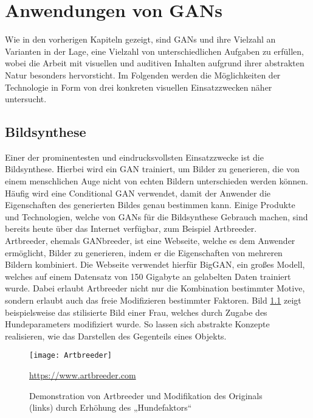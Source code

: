 \chapter{Anwendungen von GANs}

\noindent Wie in den vorherigen Kapiteln gezeigt, sind GANs und ihre Vielzahl an Varianten in der Lage, eine Vielzahl von unterschiedlichen Aufgaben zu erfüllen, wobei die Arbeit mit visuellen und auditiven Inhalten aufgrund ihrer abstrakten Natur besonders hervorsticht. Im Folgenden werden die Möglichkeiten der Technologie in Form von drei konkreten visuellen Einsatzzwecken näher untersucht. \\

\section{Bildsynthese}

\noindent Einer der prominentesten und eindrucksvollsten Einsatzzwecke ist die Bildsynthese. Hierbei wird ein GAN trainiert, um Bilder zu generieren, die von einem menschlichen Auge nicht von echten Bildern unterschieden werden können. Häufig wird eine Conditional GAN verwendet, damit der Anwender die Eigenschaften des generierten Bildes genau bestimmen kann. Einige Produkte und Technologien, welche von GANs für die Bildsynthese Gebrauch machen, sind bereits heute über das Internet verfügbar, zum Beispiel Artbreeder. \\

\noindent Artbreeder, ehemals GANbreeder, ist eine Webseite, welche es dem Anwender ermöglicht, Bilder zu generieren, indem er die Eigenschaften von mehreren Bildern kombiniert. Die Webseite verwendet hierfür BigGAN, ein großes Modell, welches auf einem Datensatz von 150 Gigabyte an gelabelten Daten trainiert wurde. Dabei erlaubt Artbreeder nicht nur die Kombination bestimmter Motive, sondern erlaubt auch das freie Modifizieren bestimmter Faktoren. Bild \ref{fig:artbreeder} zeigt beispielsweise das stilisierte Bild einer Frau, welches durch Zugabe des Hundeparameters modifiziert wurde. So lassen sich abstrakte Konzepte realisieren, wie das Darstellen des Gegenteils eines Objekts. 

\newpage

\begin{figure}[H]
    \centering
    \texttt{[image: Artbreeder]}
    \caption{Demonstration von Artbreeder und Modifikation des Originals (links) durch Erhöhung des „Hundefaktors“} \quelle\url{https://www.artbreeder.com}
\label{fig:artbreeder}
\end{figure}


